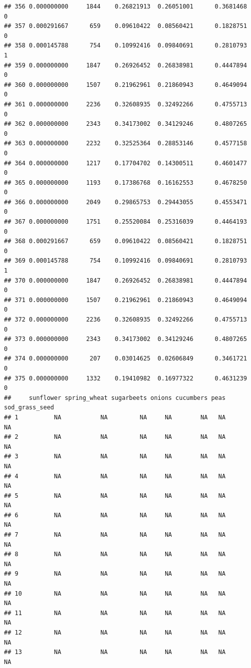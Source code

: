 \documentclass[
]{article}
\begin{document}
\begin{verbatim}
## 356 0.000000000     1844    0.26821913  0.26051001      0.3681468       0
## 357 0.000291667      659    0.09610422  0.08560421      0.1828751       0
## 358 0.000145788      754    0.10992416  0.09840691      0.2810793       1
## 359 0.000000000     1847    0.26926452  0.26838981      0.4447894       0
## 360 0.000000000     1507    0.21962961  0.21860943      0.4649094       0
## 361 0.000000000     2236    0.32608935  0.32492266      0.4755713       0
## 362 0.000000000     2343    0.34173002  0.34129246      0.4807265       0
## 363 0.000000000     2232    0.32525364  0.28853146      0.4577158       0
## 364 0.000000000     1217    0.17704702  0.14300511      0.4601477       0
## 365 0.000000000     1193    0.17386768  0.16162553      0.4678250       0
## 366 0.000000000     2049    0.29865753  0.29443055      0.4553471       0
## 367 0.000000000     1751    0.25520084  0.25316039      0.4464193       0
## 368 0.000291667      659    0.09610422  0.08560421      0.1828751       0
## 369 0.000145788      754    0.10992416  0.09840691      0.2810793       1
## 370 0.000000000     1847    0.26926452  0.26838981      0.4447894       0
## 371 0.000000000     1507    0.21962961  0.21860943      0.4649094       0
## 372 0.000000000     2236    0.32608935  0.32492266      0.4755713       0
## 373 0.000000000     2343    0.34173002  0.34129246      0.4807265       0
## 374 0.000000000      207    0.03014625  0.02606849      0.3461721       0
## 375 0.000000000     1332    0.19410982  0.16977322      0.4631239       0
##     sunflower spring_wheat sugarbeets onions cucumbers peas sod_grass_seed
## 1          NA           NA         NA     NA        NA   NA             NA
## 2          NA           NA         NA     NA        NA   NA             NA
## 3          NA           NA         NA     NA        NA   NA             NA
## 4          NA           NA         NA     NA        NA   NA             NA
## 5          NA           NA         NA     NA        NA   NA             NA
## 6          NA           NA         NA     NA        NA   NA             NA
## 7          NA           NA         NA     NA        NA   NA             NA
## 8          NA           NA         NA     NA        NA   NA             NA
## 9          NA           NA         NA     NA        NA   NA             NA
## 10         NA           NA         NA     NA        NA   NA             NA
## 11         NA           NA         NA     NA        NA   NA             NA
## 12         NA           NA         NA     NA        NA   NA             NA
## 13         NA           NA         NA     NA        NA   NA             NA

\end{verbatim}
\end{document}
